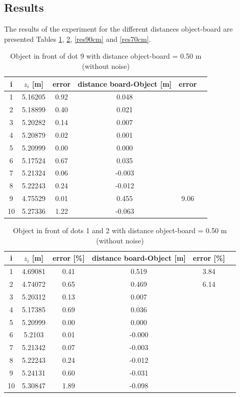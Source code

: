 \subsection{Results}
The results of the experiment for the different distances object-board are presented Tables \ref{res50cm}, \ref{res50cm2}, \ref{res90cm} and \ref{res70cm}.

\begin{table}[H]
\centering
\caption{Object in front of dot 9 with distance object-board = 0.50 m (without noise)}
\label{res50cm}
\renewcommand{\arraystretch}{1.5}
\begin{tabular}{|c|c|c|c|c|c|}
\hline
i & $z_i$ [m] & error\footnotemark[1] [\%] & distance board-Object [m] & error\footnotemark[1] [\%] \\
\hline
1 & 5.16205 & 0.92 & 0.048 & \\
\hline
2 & 5.18899 & 0.40 & 0.021 & \\
\hline
3 & 5.20282 & 0.14 & 0.007 & \\
\hline
4 & 5.20879 & 0.02 & 0.001 & \\
\hline
5 & 5.20999 & 0.00 & 0.000 & \\
\hline
6 & 5.17524 & 0.67 & 0.035 & \\
\hline 
7 & 5.21324 & 0.06 & -0.003 & \\
\hline
8 & 5.22243 & 0.24 & -0.012 & \\
\hline
9 & 4.75529 & 0.01 & 0.455 & 9.06 \\
\hline
10 & 5.27336 & 1.22 & -0.063 & \\
\hline
\end{tabular}
\end{table}

\begin{table}[H]
\centering
\caption{Object in front of dots 1 and 2 with distance object-board = 0.50 m (without noise)}
\label{res50cm2}
\renewcommand{\arraystretch}{1.5}
\begin{tabular}{|c|c|c|c|c|c|}
\hline
i & $z_i$ [m] & error [\%] & distance board-Object [m] & error [\%] \\
\hline
1 & 4.69081 & 0.41 & 0.519 & 3.84 \\
\hline
2 & 4.74072 & 0.65 & 0.469 & 6.14 \\
\hline
3 & 5.20312 & 0.13 & 0.007 & \\
\hline
4 & 5.17385 & 0.69 & 0.036 & \\
\hline
5 & 5.20999 & 0.00 & 0.000 & \\
\hline
6 & 5.2103 & 0.01 & -0.000 & \\
\hline 
7 & 5.21342 & 0.07 & -0.003 & \\
\hline
8 & 5.22243 & 0.24 & -0.012 & \\
\hline
9 & 5.24131 & 0.60 & -0.031 & \\
\hline
10 & 5.30847 & 1.89 & -0.098 & \\
\hline
\end{tabular}
\end{table}




